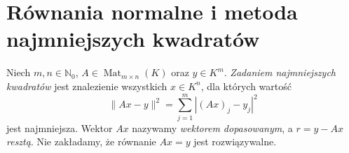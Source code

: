 \section{Równania normalne i metoda najmniejszych kwadratów}
\label{sec:lin13-least-squares}

\begin{definicja}
\label{def:lin13-ls}
Niech \(m,n\in\mathbb N_0\),
\(A\in\operatorname{Mat}_{m\times n}(K)\)
oraz \(y\in K^m\).
\emph{Zadaniem najmniejszych kwadratów}
jest znalezienie wszystkich \(x\in K^n\),
dla których wartość
\[
 \|Ax-y\|^2
 =\sum_{j=1}^m |(Ax)_j-y_j|^2
\]
jest najmniejsza.
Wektor \(Ax\) nazywamy
\emph{wektorem dopasowanym},
a \(r=y-Ax\) \emph{resztą}.
Nie zakładamy, że równanie
\(Ax=y\) jest rozwiązywalne.
\end{definicja}

